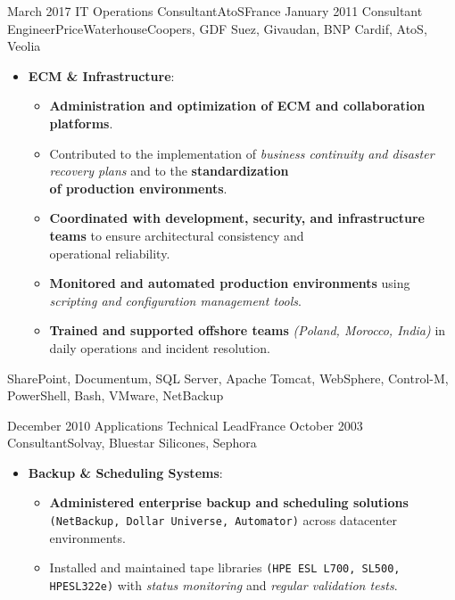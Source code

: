 \begin{experiences}
\emptySeparator
\emptySeparator

\consultantexperience
    {March 2017}       {IT Operations Consultant}{AtoS}{France}
    {January 2011}    {Consultant Engineer}{PriceWaterhouseCoopers, GDF Suez, Givaudan, BNP Cardif, AtoS, Veolia} {
        \begin{itemize}[left=0pt,label={},itemsep=0.4em]
        \vspace{0.5em}  %
          \item \textbf{ECM \& Infrastructure}:
            \begin{itemize}[itemsep=0.15em,topsep=0.1em,parsep=0pt]
              \small
              \item \textbf{Administration and optimization of ECM and collaboration platforms}.
              \item Contributed to the implementation of \emph{business continuity and disaster recovery plans} and to the \textbf{standardization \\ of production environments}.
              \item \textbf{Coordinated with development, security, and infrastructure teams} to ensure architectural consistency and \\ operational reliability.
              \item \textbf{Monitored and automated production environments} using \emph{scripting and configuration management tools}.
              \item \textbf{Trained and supported offshore teams} \emph{(Poland, Morocco, India)} in daily operations and incident resolution.
            \end{itemize}
        \end{itemize}
       \vspace{0.5em}  %
    }
    {SharePoint, Documentum, SQL Server, Apache Tomcat, WebSphere, Control-M, PowerShell, Bash, VMware, NetBackup}

\emptySeparator

\consultantexperience
    {December 2010} {Applications Technical Lead}{}{France}
    {October 2003}    {Consultant}{Solvay, Bluestar Silicones, Sephora} {
        \begin{itemize}[left=0pt,label={},itemsep=0.5em]
        \vspace{0.5em}  %
          \item \textbf{Backup \& Scheduling Systems}:
            \begin{itemize}[itemsep=0.2em,topsep=0.2em,parsep=0pt]
              \small
              \item \textbf{Administered enterprise backup and scheduling solutions} \texttt{(NetBackup, Dollar Universe, Automator)} across datacenter environments.
              \item Installed and maintained tape libraries \texttt{(HPE ESL L700, SL500, HPESL322e)} with \emph{status monitoring} and \emph{regular validation tests}.


\end{itemize}
\end{itemize}}
\end{experiences}
